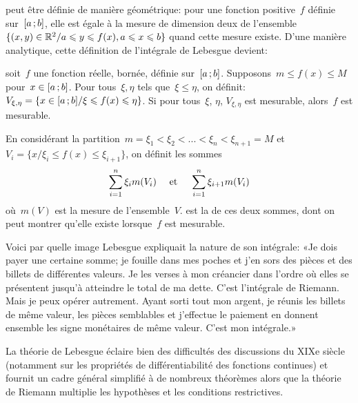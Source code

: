 \begin{histoire}
peut être définie de manière géométrique: pour une fonction
positive~$f$ définie sur~$\mathopen{[}a\,;b\mathclose{]}$, elle est égale à la mesure de dimension deux de l'ensemble
$\{(x,y)\in\mathbb R^2 / a\leqslant y\leqslant f(x), a\leqslant x\leqslant b\}$ quand cette mesure existe.
D'une manière analytique, cette définition de l'intégrale de Lebesgue devient:

\begin{definition}
soit~$f$ une fonction réelle, bornée, définie sur~$\mathopen{[}a\,;b\mathclose{]}$.
Supposons~$m\le f(x)\le M$ pour~$x\in\mathopen{[}a\,;b\mathclose{]}$.
Pour tous~$\xi, \eta$ tels que~$\xi\le\eta$, on définit:
$V_{\xi,\eta}=\{x\in\mathopen{[}a\,;b\mathclose{]}/ \xi\leqslant f(x)\leqslant\eta\}$.
Si pour tous~$\xi$, $\eta$, $V_{\xi,\eta}$ est mesurable, alors~$f$ est mesurable.

En considérant la partition~$m=\xi_1<\xi_2<...<\xi_n<\xi_{n+1}=M$ et
$V_i=\{x/ \xi_i\le f(x)\le\xi_{i+1}\}$, on définit les sommes
\begin{equation} \displaystyle\sum_{i=1}^n\xi_i m(V_i) \quad \text{ et }\quad \displaystyle\sum_{i=1}^n\xi_{i+1} m(V_i) \end{equation}
où~$m(V)$ est la mesure de l'ensemble~$V$.
 est la
 de ces deux sommes, dont on peut montrer qu'elle existe lorsque~$f$ est mesurable.
\end{definition}

\medskip
Voici par quelle image Lebesgue
expliquait la nature de son intégrale: «Je
dois payer une certaine somme; je fouille dans mes poches et j'en sors des pièces
et des billets de différentes valeurs. Je les verses à mon créancier dans l'ordre où
elles se présentent jusqu'à atteindre le total de ma dette. C'est l'intégrale de
Riemann.
Mais je peux opérer autrement. Ayant sorti tout mon argent, je réunis
les billets de même valeur, les pièces semblables et j'effectue le paiement en
donnent ensemble les signe monétaires de même valeur. C'est mon intégrale.»

\medskip
La théorie de Lebesgue
éclaire bien des difficultés des discussions du
XIXe siècle (notamment sur les propriétés de différentiabilité des fonctions
continues) et fournit un cadre général simplifié à de nombreux théorèmes
alors que la théorie de Riemann
multiplie les hypothèses et les conditions restrictives.


\end{histoire}
